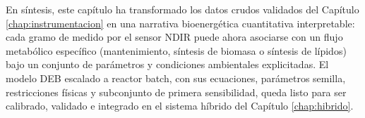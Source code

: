 En síntesis, este capítulo ha transformado los datos crudos validados del Capítulo \ref{chap:instrumentacion} en una narrativa bioenergética cuantitativa interpretable: cada gramo de  medido por el sensor NDIR puede ahora asociarse con un flujo metabólico específico (mantenimiento, síntesis de biomasa o síntesis de lípidos) bajo un conjunto de parámetros y condiciones ambientales explicitadas. El modelo DEB escalado a reactor batch, con sus ecuaciones, parámetros semilla, restricciones físicas y subconjunto de primera sensibilidad, queda listo para ser calibrado, validado e integrado en el sistema híbrido del Capítulo \ref{chap:hibrido}.
